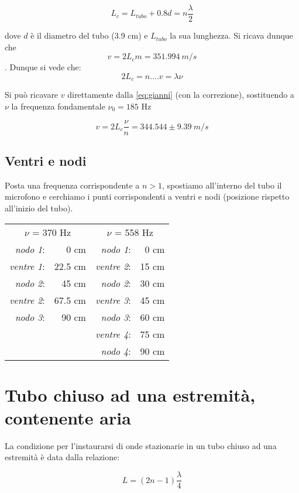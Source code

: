$$ L_c = L_{tubo}+0.8d = n\frac{\lambda}{2} $$

dove $d$ è il diametro del tubo (3.9 cm) e $L_{tubo}$ la sua lunghezza. 
Si ricava dunque che $$v=2L_cm=351.994\ m/s$$.
Dunque si vede che:
$$ 2L_c= n.... v = \lambda\nu$$

Si può ricavare $v$ direttamente dalla \ref{eq:gianni} (con la correzione), sostituendo a $\nu$ la frequenza fondamentale $\nu_0 = 185$ Hz

$$ v = 2L_c\frac{\nu}{n} = 344.544\pm9.39\ m/s$$ 
   
 
\subsection{Ventri e nodi}

Posta una frequenza corrispondente a $n>1$, spostiamo all'interno del tubo il microfono e cerchiamo i punti corrispondenti a ventri e nodi (posizione rispetto all'inizio del tubo).\\

\begin{center}
\begin{tabular}{r r r r}

\multicolumn{2}{c}{$\nu$ = 370 Hz}&\multicolumn{2}{c}{$\nu$ = 558 Hz}\\
\textit{nodo 1}:& 0 cm & \textit{nodo 1}:& 0 cm\\
\textit{ventre 1}:& 22.5 cm & \textit{ventre 2}:& 15 cm\\
\textit{nodo 2}:& 45 cm &\textit{nodo 2}:& 30 cm\\
\textit{ventre 2}:& 67.5 cm&\textit{ventre 3}:& 45 cm\\
\textit{nodo 3}:& 90 cm & \textit{nodo 3}:& 60 cm\\
& & \textit{ventre 4}:& 75 cm \\
& & \textit{nodo 4}:& 90 cm \\
\end{tabular}
\end{center}

 
\section{Tubo chiuso ad una estremità, contenente aria}

La condizione per l'instaurarsi di onde stazionarie in un tubo chiuso ad una estremità è data dalla relazione:

\begin{equation}
 L=(2n-1)\frac{\lambda}{4}
\end{equation}

